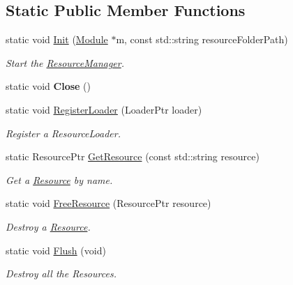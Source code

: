 \subsection*{Static Public Member Functions}
\begin{DoxyCompactItemize}
\item 
static void \hyperlink{classTarbora_1_1ResourceManager_a92a90cbe0795350a30b45ba1f6e14a7f}{Init} (\hyperlink{classTarbora_1_1Module}{Module} $\ast$m, const std\+::string resource\+Folder\+Path)
\begin{DoxyCompactList}\small\item\em Start the \hyperlink{classTarbora_1_1ResourceManager}{Resource\+Manager}. \end{DoxyCompactList}\item 
\mbox{\label{classTarbora_1_1ResourceManager_ad4a1c0a551c5a788aaa18688ca7f7592}} 
static void {\bfseries Close} ()
\item 
static void \hyperlink{classTarbora_1_1ResourceManager_a531683525f49833ac4b06916cd8a2bc8}{Register\+Loader} (Loader\+Ptr loader)
\begin{DoxyCompactList}\small\item\em Register a {\itshape Resource\+Loader}. \end{DoxyCompactList}\item 
static Resource\+Ptr \hyperlink{classTarbora_1_1ResourceManager_a755c3216ac424ec13d28fa84b0814e0b}{Get\+Resource} (const std\+::string resource)
\begin{DoxyCompactList}\small\item\em Get a \hyperlink{classTarbora_1_1Resource}{Resource} by name. \end{DoxyCompactList}\item 
static void \hyperlink{classTarbora_1_1ResourceManager_a7267c1da4dc124b41f34b6c870fdb10e}{Free\+Resource} (Resource\+Ptr resource)
\begin{DoxyCompactList}\small\item\em Destroy a \hyperlink{classTarbora_1_1Resource}{Resource}. \end{DoxyCompactList}\item 
\mbox{\label{classTarbora_1_1ResourceManager_aaef7ce514df5baa069b870aa69d9626e}} 
static void \hyperlink{classTarbora_1_1ResourceManager_aaef7ce514df5baa069b870aa69d9626e}{Flush} (void)
\begin{DoxyCompactList}\small\item\em Destroy all the Resources. \end{DoxyCompactList}\item 

\end{DoxyCompactItemize}
